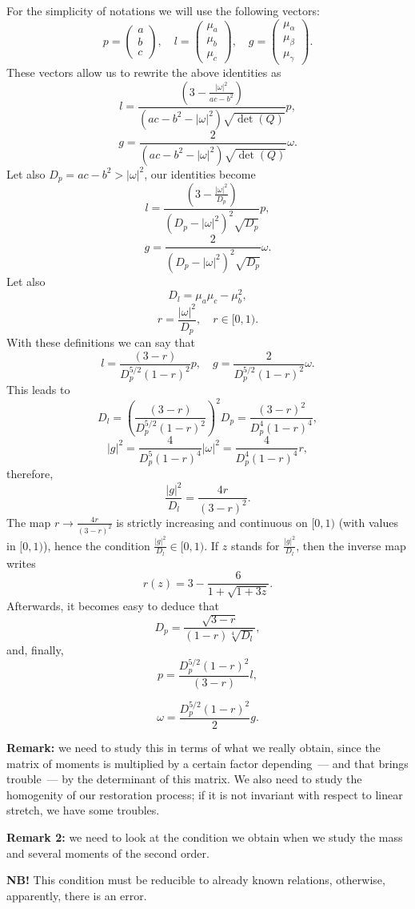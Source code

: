 For the simplicity of notations we will use the following vectors:
\[
    p = \begin{pmatrix}
        a\\b\\c
    \end{pmatrix},
    \quad
    l = \begin{pmatrix}
        \mu_a\\\mu_b\\\mu_c
    \end{pmatrix},
    \quad 
    g = \begin{pmatrix}
        \mu_{\alpha}\\\mu_{\beta}\\\mu_{\gamma}
    \end{pmatrix}.
\]
These vectors allow us to rewrite the above identities as
\[
    l = \frac{  \left(3-\frac{|\omega|^2}{ac-b^2}\right)}
    {(ac-b^2-|\omega|^2)\sqrt {\det(Q)}}p,
\]
\[
    g =  \frac{2 }{(ac-b^2-|\omega|^2)\sqrt {\det(Q)}}\omega.
\]
Let also $D_p=ac-b^2>|\omega|^2$, our identities become
\[
    l = \frac{  \left(3-\frac{|\omega|^2}{D_p}\right)}{(D_p-|\omega|^2)^2\sqrt { D_p}}p,
\]
\[
    g =  \frac{2 }{(D_p-|\omega|^2)^2\sqrt { D_p}}\omega.
\]
Let also 
\[
    D_l = \mu_a \mu_c- \mu_b^2,
\]
\[
    r = \frac{|\omega|^2}{D_p},\quad  r\in[0,1) .
\]
With these definitions we can say that
\[
    l = \frac{ (3-r )}{D_p^{5/2}(1-r)^2}p,
    \quad g = \frac{2 }{D_p^{5/2}(1-r)^2}\omega.
\]
This leads to
\[
    D_l = \left( \frac{ (3-r )} {D_p^{5/2}(1-r)^2}\right)^2 D_p = 
       \frac{ (3-r )^2} {D_p^{4}(1-r)^4}, 
\]
\[
    |g|^2 = \frac{4 }{D_p^{5 }(1-r)^4}|\omega|^2 =
    \frac{4 }{D_p^{4 }(1-r)^4}r,
\]
therefore,
\[
    \frac{|g|^2}{D_l}=\frac{4r}{(3-r )^2}.
\]
The map $r\to\frac{4r}{(3-r )^2} $ is strictly increasing and continuous on $[0,1)$ (with values in $[0,1)$), hence the condition $ \frac{|g|^2}{D_l}\in[0,1)$. If $z$ stands for $\frac{|g|^2}{D_l}$, then the inverse map writes
\[
    r(z)=3 - \frac{6}{1+\sqrt{1+3z}}.
\]
Afterwards, it becomes easy to deduce that
\[
    D_p = \frac{\sqrt{3-r}}{(1-r)\sqrt[4]{D_l}},
\]
and, finally,
\[
    p = \frac{D_p^{5/2}(1-r)^2}{ (3-r )}l,
\]

\[
    \omega = \frac{D_p^{5/2}(1-r)^2}{2 }g.
\]


\textbf{Remark:} we need to study this in terms of what we really obtain, since the matrix of moments is multiplied by a certain factor depending~--- and that brings trouble~--- by the determinant of this matrix. We also need to study the homogenity of our restoration process; if it is not invariant with respect to linear stretch, we have some troubles.

\textbf{Remark 2:} we need to look at the condition we obtain when we study the mass and several moments of the second order.

\textbf{NB!} This condition must be reducible to already known relations, otherwise, apparently, there is an error.


